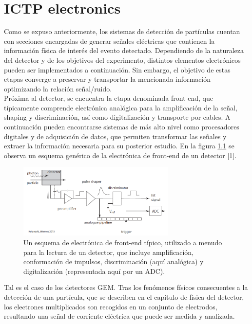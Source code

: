 \documentclass[]{book}
\begin{document}
\chapter{ICTP electronics}

\noindent Como se expuso anteriormente, los sistemas de detección de partículas cuentan con secciones encargadas de generar señales eléctricas que contienen la información física de interés del evento detectado. Dependiendo de la naturaleza del detector y de los objetivos del experimento, distintos elementos electrónicos pueden ser implementados a continuación. Sin embargo, el objetivo de estas etapas converge a preservar y transportar la mencionada información optimizando la relación señal/ruido. \\

\noindent Próxima al detector, se encuentra la etapa denominada front-end, que típicamente comprende electrónica analógica para la amplificación de la señal, shaping y discriminación, así como digitalización y transporte por cables. A continuación pueden encontrarse sistemas de más alto nivel como procesadores digitales y de adquisición de datos, que permiten transformar las señales y extraer la información necesaria para su posterior estudio. En la figura \ref{fig:generic_frontend} se observa un esquema genérico de la electrónica de front-end de un detector [1].

\begin{figure}[h]
    \centering
    \includegraphics[width=0.7\textwidth]{typical_readout_electronics.PNG}
    \caption{Un esquema de electrónica de front-end típico, utilizado a menudo para la lectura de un
    detector, que incluye amplificación, conformación de impulsos, discriminación
    (aquí analógica) y digitalización (representada aquí por un ADC).}
    \label{fig:generic_frontend}

\end{figure}
    
\noindent Tal es el caso de los detectores GEM. Tras los fenómenos físicos consecuentes a la detección de una partícula, que se describen en el capítulo de física del detector, los electrones multiplicados son recogidos en un conjunto de electrodos, resultando una señal de corriente eléctrica que puede ser medida y analizada.\\
\end{document}
